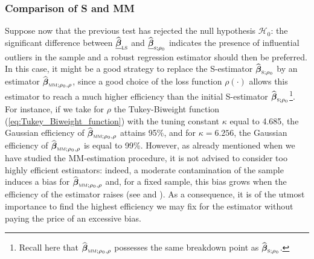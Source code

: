 \subsubsection{Comparison of S and MM}

Suppose now that the previous test has rejected the null hypothesis
$\mathcal{H}_{0}$: the significant difference between $\sthat{\underline
{\boldsymbol\beta}}_{\stsc{LS}}$ and $\sthat{\underline
{\boldsymbol\beta}}_{\stsc{S};\rho_{0}}$ indicates the presence of
influential outliers in the sample and a robust regression estimator should
then be preferred. In this case, it might be a good strategy to replace the
S-estimator $\sthat{\boldsymbol\beta}_{\stsc{S};\rho_{0}}$ by an
 estimator $\sthat{\boldsymbol\beta}_{\stsc{MM};\rho_{0},\rho}$, since
a good choice of the loss function $\rho\left(  \cdot\right)  $ allows this
 estimator to reach a much higher efficiency than the initial S-estimator
$\sthat{\boldsymbol\beta}_{\stsc{S};\rho_{0}}$\footnote{Recall here that
$\sthat{\boldsymbol\beta}_{\stsc{MM};\rho_{0},\rho}$ possesses the same
breakdown point as $\sthat{\boldsymbol\beta}_{\stsc{S};\rho_{0}}$.}. For
instance, if we take for $\rho$ the Tukey-Biweight function
(\ref{eq:Tukey_Biweight_function}) with the tuning constant $\kappa$ equal to
4.685, the Gaussian efficiency of $\sthat{\boldsymbol\beta}_{\stsc{MM}%
;\rho_{0},\rho}$ attains 95\%, and for $\kappa=6.256$, the Gaussian efficiency
of $\sthat{\boldsymbol\beta}_{\stsc{MM};\rho_{0},\rho}$ is equal to
99\%. However, as already mentioned when we have studied the MM-estimation
procedure, it is not advised to consider too highly efficient  estimators:
indeed, a moderate contamination of the sample induces a bias for
$\sthat{\boldsymbol\beta}_{\stsc{MM};\rho_{0},\rho}$ and, for a fixed
sample, this bias grows when the efficiency of the estimator raises (see
\citealp{maronna:etal:2006} and \citealp{Omelka:2010}).
As a consequence, it is of the utmost importance to find the highest
efficiency we may fix for the  estimator without paying the price of an
excessive bias.

